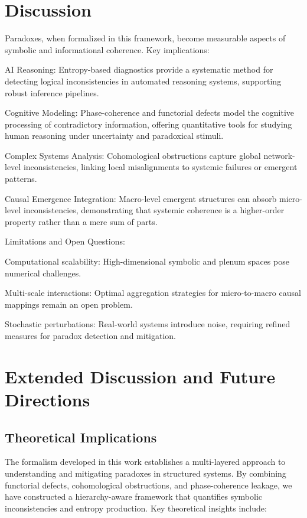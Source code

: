 \documentclass[12pt]{article}
\theoremstyle{plain}
\begin{document}
\section{Discussion}

Paradoxes, when formalized in this framework, become measurable aspects of symbolic and informational coherence. Key implications:

AI Reasoning: Entropy-based diagnostics provide a systematic method for detecting logical inconsistencies in automated reasoning systems, supporting robust inference pipelines.

Cognitive Modeling: Phase-coherence and functorial defects model the cognitive processing of contradictory information, offering quantitative tools for studying human reasoning under uncertainty and paradoxical stimuli.

Complex Systems Analysis: Cohomological obstructions capture global network-level inconsistencies, linking local misalignments to systemic failures or emergent patterns.

Causal Emergence Integration: Macro-level emergent structures can absorb micro-level inconsistencies, demonstrating that systemic coherence is a higher-order property rather than a mere sum of parts.

Limitations and Open Questions:

Computational scalability: High-dimensional symbolic and plenum spaces pose numerical challenges.

Multi-scale interactions: Optimal aggregation strategies for micro-to-macro causal mappings remain an open problem.

Stochastic perturbations: Real-world systems introduce noise, requiring refined measures for paradox detection and mitigation.

\section{Extended Discussion and Future Directions}

\subsection{Theoretical Implications}

The formalism developed in this work establishes a multi-layered approach to understanding and mitigating paradoxes in structured systems. By combining functorial defects, cohomological obstructions, and phase-coherence leakage, we have constructed a hierarchy-aware framework that quantifies symbolic inconsistencies and entropy production. Key theoretical insights include:
\end{document}
